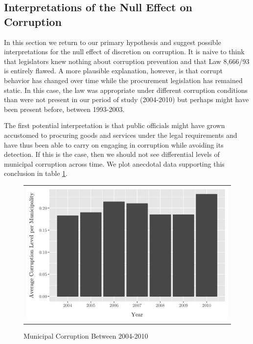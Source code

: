 \documentclass[11pt]{article}
\begin{document}
\subsection{Interpretations of the Null Effect on Corruption} \label{subsec:nullcorruption}

In this section we return to our primary hypothesis and suggest possible interpretations for the null effect of discretion on corruption. It is naive to think that legislators knew nothing about corruption prevention and that Law 8,666/93 is entirely flawed. A more plausible explanation, however, is that corrupt behavior has changed over time while the procurement legislation has remained static. In this case, the law was appropriate under different corruption conditions than were not present in our period of study (2004-2010) but perhaps might have been present before, between 1993-2003.

The first potential interpretation is that public officials might have grown accustomed to procuring goods and services under the legal requirements and have thus been able to carry on engaging in corruption while avoiding its detection. If this is the case, then we should not see differential levels of municipal corruption across time. We plot anecdotal data supporting this conclusion in table \ref{fig:01discussion}.

\begin{figure}[!htbp]
  \caption{Municipal Corruption Between 2004-2010}
  \label{fig:01discussion}
  \centering
  \small
  \begin{tabular}{c}
  \includegraphics[scale = .14]{01discussionplot}
  \end{tabular}
\end{figure}
\end{document}
